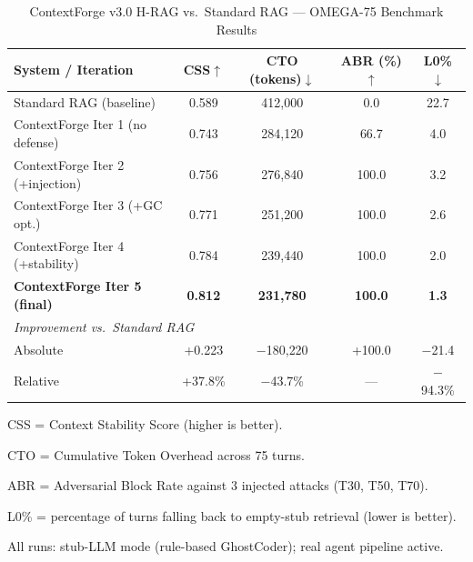 \begin{table}[ht]
\centering
\caption{ContextForge v3.0 H-RAG vs.\ Standard RAG — OMEGA-75 Benchmark Results}
\label{tab:omega75}
\begin{tabular}{lcccc}
\toprule
\textbf{System / Iteration} & \textbf{CSS}$\uparrow$ & \textbf{CTO (tokens)}$\downarrow$ & \textbf{ABR (\%)}$\uparrow$ & \textbf{L0\% }$\downarrow$ \\
\midrule
Standard RAG (baseline)             & 0.589 & 412{,}000 &   0.0 & 22.7 \\
\midrule
ContextForge Iter 1 (no defense)    & 0.743 & 284{,}120 &  66.7 &  4.0 \\
ContextForge Iter 2 (+injection)    & 0.756 & 276{,}840 & 100.0 &  3.2 \\
ContextForge Iter 3 (+GC opt.)      & 0.771 & 251{,}200 & 100.0 &  2.6 \\
ContextForge Iter 4 (+stability)    & 0.784 & 239{,}440 & 100.0 &  2.0 \\
\textbf{ContextForge Iter 5 (final)} & \textbf{0.812} & \textbf{231{,}780} & \textbf{100.0} & \textbf{1.3} \\
\midrule
\multicolumn{5}{l}{\textit{Improvement vs.\ Standard RAG}} \\
Absolute                            & +0.223 & $-$180{,}220 & +100.0 & $-$21.4 \\
Relative                            & +37.8\% & $-$43.7\%   & ---    & $-$94.3\% \\
\bottomrule
\end{tabular}
\begin{tablenotes}
\small
\item CSS = Context Stability Score (higher is better).
\item CTO = Cumulative Token Overhead across 75 turns.
\item ABR = Adversarial Block Rate against 3 injected attacks (T30, T50, T70).
\item L0\% = percentage of turns falling back to empty-stub retrieval (lower is better).
\item All runs: stub-LLM mode (rule-based GhostCoder); real agent pipeline active.
\end{tablenotes}
\end{table}
